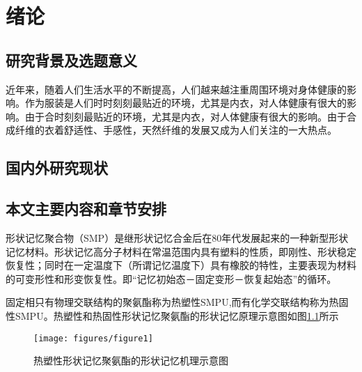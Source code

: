 \chapter{绪论}
\label{chap:intro}
\section{研究背景及选题意义}

近年来，随着人们生活水平的不断提高，人们越来越注重周围环境对身体健康的影响。作为服装是人们时时刻刻最贴近的环境，尤其是内衣，对人体健康有很大的影响。由于合时刻刻最贴近的环境，尤其是内衣，对人体健康有很大的影响。由于合成纤维的衣着舒适性、手感性，天然纤维的发展又成为人们关注的一大热点。\supercite{Takahashi1996Structure,Xia2002Analysis,Jiang1989,Mao2000Motion,Feng1998}

\section{国内外研究现状}

\section{本文主要内容和章节安排}


形状记忆聚合物（SMP）是继形状记忆合金后在80年代发展起来的一种新型形状记忆材料\cite{Jiang2005Size}。形状记忆高分子材料在常温范围内具有塑料的性质，即刚性、形状稳定恢复性；同时在一定温度下（所谓记忆温度下）具有橡胶的特性，主要表现为材料的可变形性和形变恢复性。即“记忆初始态－固定变形－恢复起始态”的循环。

固定相只有物理交联结构的聚氨酯称为热塑性SMPU,而有化学交联结构称为热固性SMPU。热塑性和热固性形状记忆聚氨酯的形状记忆原理示意图如图\ref{fig:diagram}所示

\begin{figure}
 \centering
 \texttt{[image: figures/figure1]}
 \caption{热塑性形状记忆聚氨酯的形状记忆机理示意图}\label{fig:diagram}
\end{figure}


